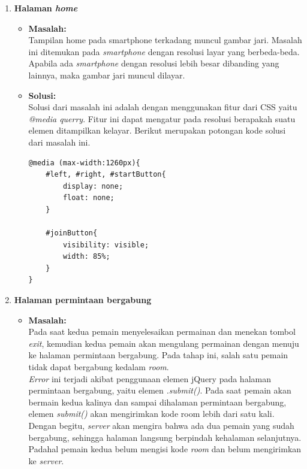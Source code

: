 \begin{enumerate}
	\item \textbf{Halaman \textit{home}}
	\begin{itemize}
		\item \textbf{Masalah:} \\
		Tampilan home pada smartphone terkadang muncul gambar jari. Masalah ini ditemukan pada \textit{smartphone} dengan resolusi layar yang berbeda-beda. Apabila ada \textit{smartphone} dengan resolusi lebih besar dibanding yang lainnya, maka gambar jari muncul dilayar.
		
		\item \textbf{Solusi:} \\
		Solusi dari masalah ini adalah dengan menggunakan fitur dari CSS yaitu \textit{@media querry}. Fitur ini dapat mengatur pada resolusi berapakah suatu elemen ditampilkan kelayar. Berikut merupakan potongan kode solusi dari masalah ini.
		
\begin{lstlisting}[caption={Fitur CSS \textit{@media querry}}, label={lst:mediaQuerry},captionpos=b]
@media (max-width:1260px){
	#left, #right, #startButton{
		display: none;
		float: none;
	}
			
	#joinButton{
		visibility: visible;
		width: 85%;
	}
}
\end{lstlisting}
	\end{itemize}

	\item \textbf{Halaman permintaan bergabung}
	\begin{itemize}
		\item \textbf{Masalah:} \\
		Pada saat kedua pemain menyelesaikan permainan dan menekan tombol \textit{exit}, kemudian kedua pemain akan mengulang permainan dengan menuju ke halaman permintaan bergabung. Pada tahap ini, salah satu pemain tidak dapat bergabung kedalam \textit{room}. \\
		
		\textit{Error} ini terjadi akibat penggunaan elemen jQuery pada halaman permintaan bergabung, yaitu elemen \textit{.submit()}. Pada saat pemain akan bermain kedua kalinya dan sampai dihalaman permintaan bergabung, elemen \textit{submit()} akan mengirimkan kode room lebih dari satu kali. Dengan begitu, \textit{server} akan mengira bahwa ada dua pemain yang sudah bergabung, sehingga halaman langsung berpindah kehalaman selanjutnya. Padahal pemain kedua belum mengisi kode \textit{room} dan belum mengirimkan ke \textit{server}.
		

\end{itemize}
\end{enumerate}
